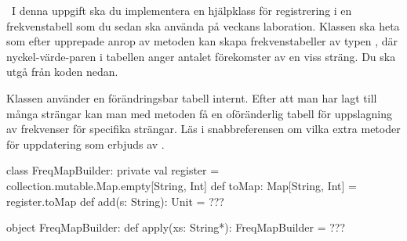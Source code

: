 


\QUESTEND






\QUESTBEGIN

\Task \what~I denna uppgift ska du implementera en hjälpklass för registrering i en frekvenstabell som du sedan ska använda på veckans laboration. Klassen ska heta   som efter upprepade anrop av metoden  kan skapa frekvenstabeller av typen , där nyckel-värde-paren i tabellen anger antalet förekomster av en viss sträng. Du ska utgå från koden nedan.

Klassen använder en förändringsbar tabell internt. Efter att man har lagt till många strängar kan man med metoden  få en oföränderlig tabell för  uppslagning av frekvenser för specifika strängar. Läs i snabbreferensen om vilka extra metoder för uppdatering som erbjuds av .

\begin{Code}
class FreqMapBuilder:
  private val register = collection.mutable.Map.empty[String, Int]
  def toMap: Map[String, Int] = register.toMap
  def add(s: String): Unit = ???

object FreqMapBuilder:
  def apply(xs: String*): FreqMapBuilder = ???
\end{Code}

